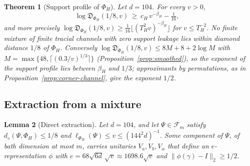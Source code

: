 \documentclass[11pt,a4paper]{article}
\theoremstyle{plain}
\newtheorem{theorem}{Theorem}[section]
\newtheorem{lemma}[theorem]{Lemma}
\theoremstyle{definition}
\theoremstyle{remark}
\newcommand{\ddia}{d_\diamond}
\newcommand{\Dsupp}{\mathfrak{D}}
\begin{document}
\begin{theorem}[Support profile of $\Phi_H$]\label{thm:support-profile}
Let $d=104$. For every $v>0$,
\[
\log\Dsupp_{\Phi_H}(1/8,v)\ \ge\ c_H\,v^{-\beta_H}-\tfrac1{16},
\]
and more precisely $\log\Dsupp_{\Phi_H}(1/8,v)\ge\frac1{16}\lfloor(T_H^2v)^{-\beta_H}\rfloor$ for $v\le T_H^{-2}$. No finite mixture of finite
tracial channels with zero support leakage lies within diamond distance $1/8$ of $\Phi_H$. Conversely
$\log\Dsupp_{\Phi_H}(1/8,v)\le8M+8+2\log M$ with $M=\max\{48,\lceil(0.3/v)^{1/3}\rceil\}$ (Proposition~\ref{prop:smoothed}), so the
exponent of the support profile lies between $\beta_H$ and $1/3$; approximants by permutations, as in Proposition~\ref{prop:corner-channel},
give the exponent $1/2$.
\end{theorem}


\subsection{Extraction from a mixture}\label{sec:extraction}

\begin{lemma}[Direct extraction]\label{lem:extraction}
Let $d=104$, and let $\Psi\in\mathcal F_m$ satisfy $\ddia(\Psi,\Phi_H)\le1/8$ and $\ell_{\Phi_H}(\Psi)\le v\le(144^2d)^{-1}$. Some
component of $\Psi$, of bath dimension at most $m$, carries unitaries $V_a,V_b,V_\alpha$ that define an $e$-representation $\phi$
with $e=68\sqrt{6d}\,\sqrt v\approx1698.6\sqrt v$ and $\|\phi(\gamma)-I\|_2\ge1/2$.
\end{lemma}
\end{document}

